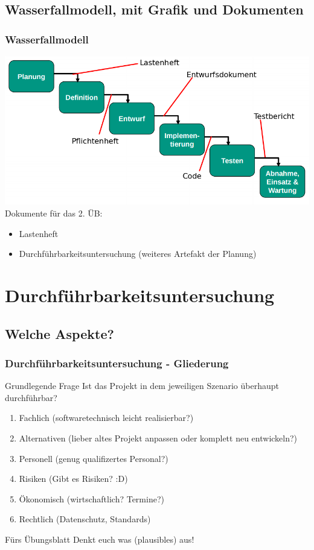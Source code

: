 \documentclass[18pt]{beamer}
\begin{document}
	\subsection{Wasserfallmodell, mit Grafik und Dokumenten}
	\begin{frame}
		\frametitle{Wasserfallmodell}
		\includegraphics[scale=0.4]{./pics/tut1/waterfall_with-docs.png}
		\pause
		Dokumente für das 2. ÜB: 
		\begin{itemize}
			\item Lastenheft
			\item Durchführbarkeitsuntersuchung (weiteres Artefakt der Planung)
		\end{itemize}
	\end{frame}

\section{Durchführbarkeitsuntersuchung}
	\subsection{Welche Aspekte?}
	\begin{frame}
		\frametitle{Durchführbarkeitsuntersuchung - Gliederung}
		\begin{block}{Grundlegende Frage}
			Ist das Projekt in dem jeweiligen Szenario überhaupt durchführbar?
		\end{block}
		\begin{enumerate}
			\item \pause Fachlich \pause (softwaretechnisch leicht realisierbar?) \pause
			\item Alternativen \pause (lieber altes Projekt anpassen oder komplett neu entwickeln?) \pause
			\item Personell \pause (genug qualifizertes Personal?) \pause
			\item Risiken \pause (Gibt es Risiken? :D) \pause
			\item Ökonomisch \pause (wirtschaftlich? Termine?) \pause
			\item Rechtlich \pause (Datenschutz, Standards)
		\end{enumerate}
		\pause
		\begin{alertblock}{Fürs Übungsblatt}
			Denkt euch was (plausibles) aus!
		\end{alertblock}
	\end{frame}
\end{document}
